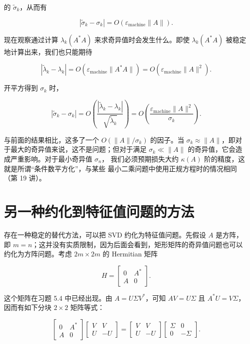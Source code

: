 \documentclass[UTF8,fontset=none,12pt]{ctexart}
\begin{document}
的 $\widetilde\sigma_k$，从而有

$$
|\widetilde\sigma_k-\sigma_k|
=O(\varepsilon_{\mathrm{machine}}\|A\|).
$$

现在观察通过计算 $\lambda_k(A^*A)$ 来求奇异值时会发生什么。即使
$\lambda_k(A^*A)$ 被稳定地计算出来，我们也只能期待

$$
|\widetilde\lambda_k-\lambda_k|
=O(\varepsilon_{\mathrm{machine}}\|A^*A\|)
=O(\varepsilon_{\mathrm{machine}}\|A\|^2).
$$

开平方得到 $\sigma_k$ 时，

$$
|\widetilde\sigma_k-\sigma_k|
=O\!\left(\frac{|\widetilde\lambda_k-\lambda_k|}
{\sqrt{\widetilde\lambda_k}}\right)
=O\!\left(\frac{\varepsilon_{\mathrm{machine}}\|A\|^2}{\sigma_k}\right).
$$

与前面的结果相比，这多了一个 $O(\|A\|/\sigma_k)$ 的因子。当
$\sigma_k\approx\|A\|$，即对于最大的奇异值来说，这不是问题；但对于满足
$\sigma_k\ll\|A\|$ 的奇异值，它会造成严重影响。对于最小奇异值 $\sigma_n$，
我们必须预期损失大约 $\kappa(A)$ 阶的精度，这就是所谓“条件数平方化”，与某些
最小二乘问题中使用正规方程时的情况相同（第 19 讲）。

\section*{另一种约化到特征值问题的方法}

存在一种稳定的替代方法，可以把 SVD 约化为特征值问题。先假设 $A$ 是方阵，
即 $m=n$；这并没有实质限制，因为后面会看到，矩形矩阵的奇异值问题也可以
约化为方阵问题。考虑 $2m\times2m$ 的 Hermitian 矩阵

\begin{equation}
H=
\begin{bmatrix}
0&A^*\\
A&0
\end{bmatrix}.
\tag{31.2}
\end{equation}

这个矩阵在习题 5.4 中已经出现。由 $A=U\Sigma V^*$，可知
$AV=U\Sigma$ 且 $A^*U=V\Sigma$，因而有如下分块 $2\times2$ 矩阵等式：

\begin{equation}
\begin{bmatrix}
0&A^*\\
A&0
\end{bmatrix}
\begin{bmatrix}
V&V\\
U&-U
\end{bmatrix}
=
\begin{bmatrix}
V&V\\
U&-U
\end{bmatrix}
\begin{bmatrix}
\Sigma&0\\
0&-\Sigma
\end{bmatrix}.
\tag{31.3}
\end{equation}
\end{document}
